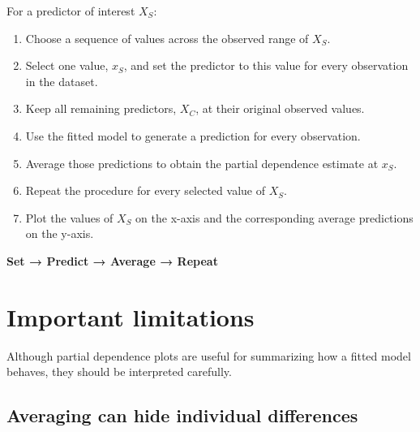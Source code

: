 \documentclass[
  letterpaper,
  DIV=11,
  numbers=noendperiod]{scrreprt}
\begin{document}
\begin{tcolorbox}[enhanced jigsaw, arc=.35mm, bottomrule=.15mm, bottomtitle=1mm, breakable, colback=white, colbacktitle=quarto-callout-tip-color!10!white, colframe=quarto-callout-tip-color-frame, coltitle=black, left=2mm, leftrule=.75mm, opacityback=0, opacitybacktitle=0.6, rightrule=.15mm, title=\textcolor{quarto-callout-tip-color}{\faLightbulb}\hspace{0.5em}{Partial Dependence Algorithm}, titlerule=0mm, toprule=.15mm, toptitle=1mm]

For a predictor of interest \(X_S\):

\begin{enumerate}
\def\labelenumi{\arabic{enumi}.}
\item
  Choose a sequence of values across the observed range of \(X_S\).
\item
  Select one value, \(x_S\), and set the predictor to this value for
  every observation in the dataset.
\item
  Keep all remaining predictors, \(X_C\), at their original observed
  values.
\item
  Use the fitted model to generate a prediction for every observation.
\item
  Average those predictions to obtain the partial dependence estimate at
  \(x_S\).
\item
  Repeat the procedure for every selected value of \(X_S\).
\item
  Plot the values of \(X_S\) on the x-axis and the corresponding average
  predictions on the y-axis.
\end{enumerate}

\textbf{Set → Predict → Average → Repeat}

\end{tcolorbox}

\section{Important limitations}\label{important-limitations}

Although partial dependence plots are useful for summarizing how a
fitted model behaves, they should be interpreted carefully.

\subsection{Averaging can hide individual
differences}\label{averaging-can-hide-individual-differences}
\end{document}
